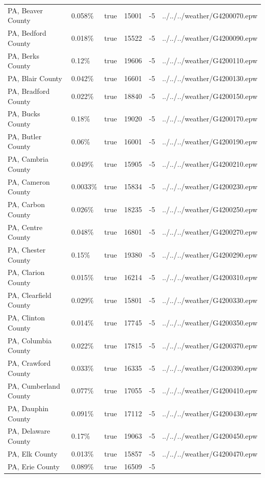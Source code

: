 \begin{longtable}[]{@{}llllll@{}}
PA, Beaver County & 0.058\% & true & 15001 & -5 &
../../../weather/G4200070.epw \\
PA, Bedford County & 0.018\% & true & 15522 & -5 &
../../../weather/G4200090.epw \\
PA, Berks County & 0.12\% & true & 19606 & -5 &
../../../weather/G4200110.epw \\
PA, Blair County & 0.042\% & true & 16601 & -5 &
../../../weather/G4200130.epw \\
PA, Bradford County & 0.022\% & true & 18840 & -5 &
../../../weather/G4200150.epw \\
PA, Bucks County & 0.18\% & true & 19020 & -5 &
../../../weather/G4200170.epw \\
PA, Butler County & 0.06\% & true & 16001 & -5 &
../../../weather/G4200190.epw \\
PA, Cambria County & 0.049\% & true & 15905 & -5 &
../../../weather/G4200210.epw \\
PA, Cameron County & 0.0033\% & true & 15834 & -5 &
../../../weather/G4200230.epw \\
PA, Carbon County & 0.026\% & true & 18235 & -5 &
../../../weather/G4200250.epw \\
PA, Centre County & 0.048\% & true & 16801 & -5 &
../../../weather/G4200270.epw \\
PA, Chester County & 0.15\% & true & 19380 & -5 &
../../../weather/G4200290.epw \\
PA, Clarion County & 0.015\% & true & 16214 & -5 &
../../../weather/G4200310.epw \\
PA, Clearfield County & 0.029\% & true & 15801 & -5 &
../../../weather/G4200330.epw \\
PA, Clinton County & 0.014\% & true & 17745 & -5 &
../../../weather/G4200350.epw \\
PA, Columbia County & 0.022\% & true & 17815 & -5 &
../../../weather/G4200370.epw \\
PA, Crawford County & 0.033\% & true & 16335 & -5 &
../../../weather/G4200390.epw \\
PA, Cumberland County & 0.077\% & true & 17055 & -5 &
../../../weather/G4200410.epw \\
PA, Dauphin County & 0.091\% & true & 17112 & -5 &
../../../weather/G4200430.epw \\
PA, Delaware County & 0.17\% & true & 19063 & -5 &
../../../weather/G4200450.epw \\
PA, Elk County & 0.013\% & true & 15857 & -5 &
../../../weather/G4200470.epw \\
PA, Erie County & 0.089\% & true & 16509 & -5 &

\end{longtable}
